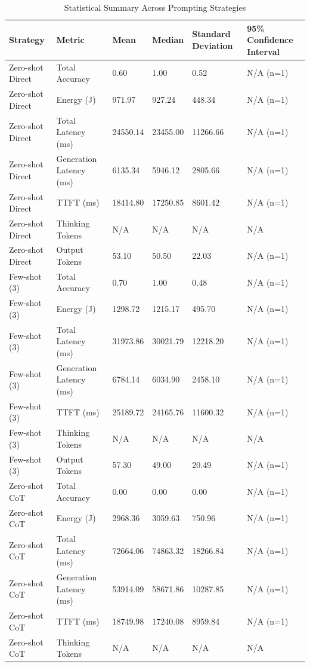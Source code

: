 \begin{table}
\caption{Statistical Summary Across Prompting Strategies}
\label{tab:statistical_summary}
\begin{tabular}{llllll}
\toprule
Strategy & Metric & Mean & Median & Standard Deviation & 95\% Confidence Interval \\
\midrule
Zero-shot Direct & Total Accuracy & 0.60 & 1.00 & 0.52 & N/A (n=1) \\
Zero-shot Direct & Energy (J) & 971.97 & 927.24 & 448.34 & N/A (n=1) \\
Zero-shot Direct & Total Latency (ms) & 24550.14 & 23455.00 & 11266.66 & N/A (n=1) \\
Zero-shot Direct & Generation Latency (ms) & 6135.34 & 5946.12 & 2805.66 & N/A (n=1) \\
Zero-shot Direct & TTFT (ms) & 18414.80 & 17250.85 & 8601.42 & N/A (n=1) \\
Zero-shot Direct & Thinking Tokens & N/A & N/A & N/A & N/A \\
Zero-shot Direct & Output Tokens & 53.10 & 50.50 & 22.03 & N/A (n=1) \\
Few-shot (3) & Total Accuracy & 0.70 & 1.00 & 0.48 & N/A (n=1) \\
Few-shot (3) & Energy (J) & 1298.72 & 1215.17 & 495.70 & N/A (n=1) \\
Few-shot (3) & Total Latency (ms) & 31973.86 & 30021.79 & 12218.20 & N/A (n=1) \\
Few-shot (3) & Generation Latency (ms) & 6784.14 & 6034.90 & 2458.10 & N/A (n=1) \\
Few-shot (3) & TTFT (ms) & 25189.72 & 24165.76 & 11600.32 & N/A (n=1) \\
Few-shot (3) & Thinking Tokens & N/A & N/A & N/A & N/A \\
Few-shot (3) & Output Tokens & 57.30 & 49.00 & 20.49 & N/A (n=1) \\
Zero-shot CoT & Total Accuracy & 0.00 & 0.00 & 0.00 & N/A (n=1) \\
Zero-shot CoT & Energy (J) & 2968.36 & 3059.63 & 750.96 & N/A (n=1) \\
Zero-shot CoT & Total Latency (ms) & 72664.06 & 74863.32 & 18266.84 & N/A (n=1) \\
Zero-shot CoT & Generation Latency (ms) & 53914.09 & 58671.86 & 10287.85 & N/A (n=1) \\
Zero-shot CoT & TTFT (ms) & 18749.98 & 17240.08 & 8959.84 & N/A (n=1) \\
Zero-shot CoT & Thinking Tokens & N/A & N/A & N/A & N/A \\

\end{tabular}
\end{table}
